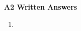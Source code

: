 \documentclass[10pt]{article}
\begin{document}
\textbf{A2 Written Answers}
\begin{enumerate}
\item 
\end{enumerate}
\end{document}
